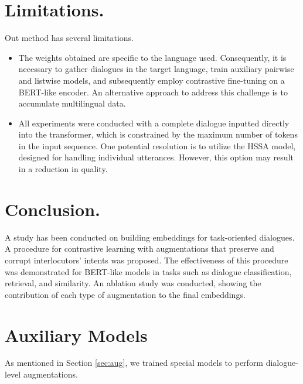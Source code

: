 \documentclass{article}
\begin{document}
\section{Limitations.}

Out method has several limitations.

\begin{itemize}
    \item The weights obtained are specific to the language used. Consequently, it is necessary to gather dialogues in the target language, train auxiliary pairwise and listwise models, and subsequently employ contrastive fine-tuning on a BERT-like encoder. An alternative approach to address this challenge is to accumulate multilingual data.
    \item All experiments were conducted with a complete dialogue inputted directly into the transformer, which is constrained by the maximum number of tokens in the input sequence. One potential resolution is to utilize the HSSA model, designed for handling individual utterances. However, this option may result in a reduction in quality.
\end{itemize}

\section{Conclusion.}

A study has been conducted on building embeddings for task-oriented dialogues. A procedure for contrastive learning with augmentations that preserve and corrupt interlocutors' intents was proposed. The effectiveness of this procedure was demonstrated for BERT-like models in tasks such as dialogue classification, retrieval, and similarity. An ablation study was conducted, showing the contribution of each type of augmentation to the final embeddings.



  
  

\appendix

\section{Auxiliary Models} \label{app:aug}

As mentioned in Section \ref{sec:aug}, we trained special models to perform dialogue-level augmentations.
\end{document}
